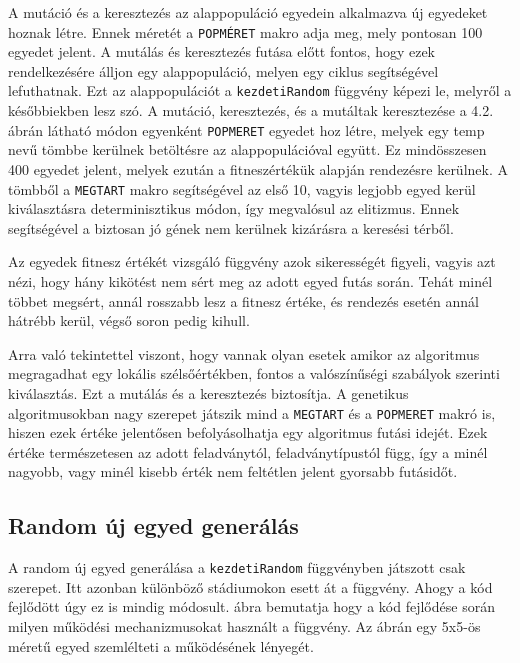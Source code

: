 \documentclass[12ppt,a4paper,oneside]{report}
\begin{document}
	A mutáció és a keresztezés az alappopuláció egyedein alkalmazva új egyedeket hoznak létre. Ennek méretét a \texttt{POPMÉRET} makro adja meg, mely pontosan 100 egyedet jelent. A mutálás és keresztezés futása előtt fontos, hogy ezek rendelkezésére álljon egy alappopuláció, melyen egy ciklus segítségével lefuthatnak. Ezt az alappopulációt a \texttt{kezdetiRandom} függvény képezi le, melyről a későbbiekben lesz szó.
	A mutáció, keresztezés, és a mutáltak keresztezése a 4.2. ábrán látható módon egyenként \texttt{POPMERET} egyedet hoz létre, melyek egy temp nevű tömbbe kerülnek betöltésre az alappopulációval együtt. Ez mindösszesen 400 egyedet jelent, melyek ezután a fitneszértékük alapján rendezésre kerülnek. A tömbből a \texttt{MEGTART} makro segítségével az első 10, vagyis legjobb egyed kerül kiválasztásra determinisztikus módon, így megvalósul az elitizmus. Ennek segítségével a biztosan jó gének nem kerülnek kizárásra a keresési térből. 
	
	Az egyedek fitnesz értékét vizsgáló függvény azok sikerességét figyeli, vagyis azt nézi, hogy hány kikötést nem sért meg az adott egyed futás során. Tehát minél többet megsért, annál rosszabb lesz a fitnesz értéke, és rendezés esetén annál hátrébb kerül, végső soron pedig kihull. 
	
	Arra való tekintettel viszont, hogy vannak olyan esetek amikor az algoritmus megragadhat egy lokális szélsőértékben, fontos a valószínűségi szabályok szerinti kiválasztás. Ezt a mutálás és a keresztezés biztosítja.
A genetikus algoritmusokban nagy szerepet játszik mind a \texttt{MEGTART} és a \texttt{POPMERET} makró is, hiszen ezek értéke jelentősen befolyásolhatja egy algoritmus futási idejét. Ezek értéke természetesen az adott feladványtól, feladványtípustól függ, így a minél nagyobb, vagy minél kisebb érték nem feltétlen jelent gyorsabb futásidőt.


        
        \subsection{Random új egyed generálás} %
        
         A random új egyed generálása a \texttt{kezdetiRandom} függvényben játszott csak szerepet.
         Itt azonban különböző stádiumokon esett át a függvény. Ahogy a kód fejlődött úgy ez is mindig módosult.
          ábra bemutatja hogy a kód fejlődése során milyen működési mechanizmusokat használt a függvény.
         Az ábrán egy 5x5-ös méretű egyed szemlélteti a működésének lényegét.
         
\end{document}
